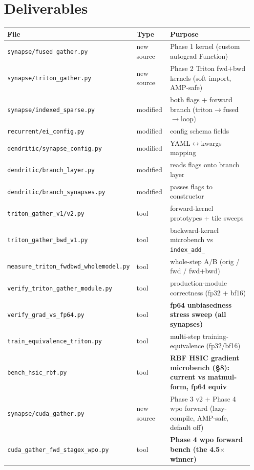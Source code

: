 \documentclass[11pt]{article}
\begin{document}
\section{Deliverables}

\begin{table}[h]
\centering
\small
\begin{tabular}{@{}lll@{}}
\toprule
\textbf{File} & \textbf{Type} & \textbf{Purpose} \\
\midrule
\texttt{synapse/fused\_gather.py} & new source & Phase 1 kernel (custom autograd Function) \\
\texttt{synapse/triton\_gather.py} & new source & Phase 2 Triton fwd$+$bwd kernels (soft import, AMP-safe) \\
\texttt{synapse/indexed\_sparse.py} & modified & both flags + forward branch (triton$\to$fused$\to$loop) \\
\texttt{recurrent/ei\_config.py} & modified & config schema fields \\
\texttt{dendritic/synapse\_config.py} & modified & YAML$\leftrightarrow$kwargs mapping \\
\texttt{dendritic/branch\_layer.py} & modified & reads flags onto branch layer \\
\texttt{dendritic/branch\_synapses.py} & modified & passes flags to constructor \\
\midrule
\texttt{triton\_gather\_v1/v2.py} & tool & forward-kernel prototypes + tile sweeps \\
\texttt{triton\_gather\_bwd\_v1.py} & tool & backward-kernel microbench vs \texttt{index\_add\_} \\
\texttt{measure\_triton\_fwdbwd\_wholemodel.py} & tool & whole-step A/B (orig / fwd / fwd$+$bwd) \\
\texttt{verify\_triton\_gather\_module.py} & tool & production-module correctness (fp32 $+$ bf16) \\
\texttt{verify\_grad\_vs\_fp64.py} & tool & \textbf{fp64 unbiasedness stress sweep (all synapses)} \\
\texttt{train\_equivalence\_triton.py} & tool & multi-step training-equivalence (fp32/bf16) \\
\texttt{bench\_hsic\_rbf.py} & tool & \textbf{RBF HSIC gradient microbench (\S8): current vs matmul-form, fp64 equiv} \\
\midrule
\texttt{synapse/cuda\_gather.py} & new source & Phase 3 v2 $+$ Phase 4 wpo forward (lazy-compile, AMP-safe, default off) \\
\texttt{cuda\_gather\_fwd\_stagex\_wpo.py} & tool & \textbf{Phase 4 wpo forward bench (the 4.5$\times$ winner)} \\

\end{tabular}
\end{table}
\end{document}
